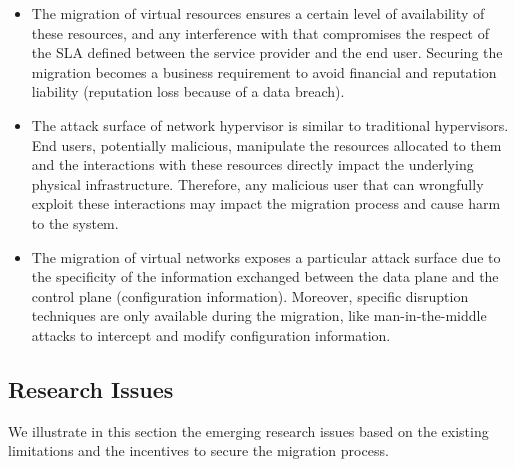 \begin{itemize}
    
    \item The migration of virtual resources ensures a certain level of availability of these resources, and any interference with that compromises the respect of the SLA defined between the service provider and the end user.
    Securing the migration becomes a business requirement to avoid financial and reputation liability (\eg reputation loss because of a data breach).
    
    \item The attack surface of network hypervisor is similar to traditional hypervisors. End users, potentially malicious, manipulate the resources allocated to them and the interactions with these resources directly impact the underlying physical infrastructure. Therefore, any malicious user that can wrongfully exploit these interactions may impact the migration process and cause harm to the system.

    \item The migration of virtual networks exposes a particular attack surface due to the specificity of the information exchanged between the data plane and the control plane (\eg configuration information). Moreover, specific disruption techniques are only available during the migration, like man-in-the-middle attacks to intercept and modify configuration information.  
\end{itemize}



\subsection{Research Issues}
We illustrate in this section the emerging research issues based on the existing limitations and the incentives to secure the migration process.

